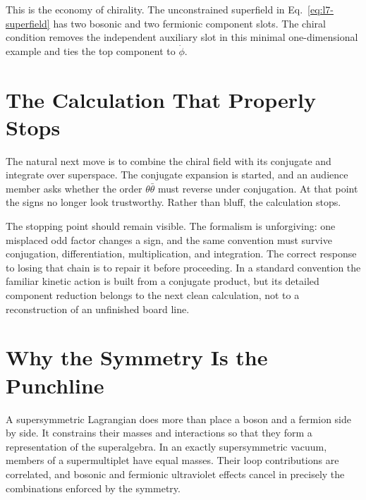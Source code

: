 This is the economy of chirality. The unconstrained superfield in Eq.~\eqref{eq:l7-superfield} has two bosonic and two fermionic component slots. The chiral condition removes the independent auxiliary slot in this minimal one-dimensional example and ties the top component to \(\dot\phi\).

\section{The Calculation That Properly Stops}

The natural next move is to combine the chiral field with its conjugate and integrate over superspace. The conjugate expansion is started, and an audience member asks whether the order \(\theta\bar\theta\) must reverse under conjugation. At that point the signs no longer look trustworthy. Rather than bluff, the calculation stops.

\begin{classroomqa}
\end{classroomqa}

The stopping point should remain visible. The formalism is unforgiving: one misplaced odd factor changes a sign, and the same convention must survive conjugation, differentiation, multiplication, and integration. The correct response to losing that chain is to repair it before proceeding. In a standard convention the familiar kinetic action is built from a conjugate product, but its detailed component reduction belongs to the next clean calculation, not to a reconstruction of an unfinished board line.

\section{Why the Symmetry Is the Punchline}

A supersymmetric Lagrangian does more than place a boson and a fermion side by side. It constrains their masses and interactions so that they form a representation of the superalgebra. In an exactly supersymmetric vacuum, members of a supermultiplet have equal masses. Their loop contributions are correlated, and bosonic and fermionic ultraviolet effects cancel in precisely the combinations enforced by the symmetry.

